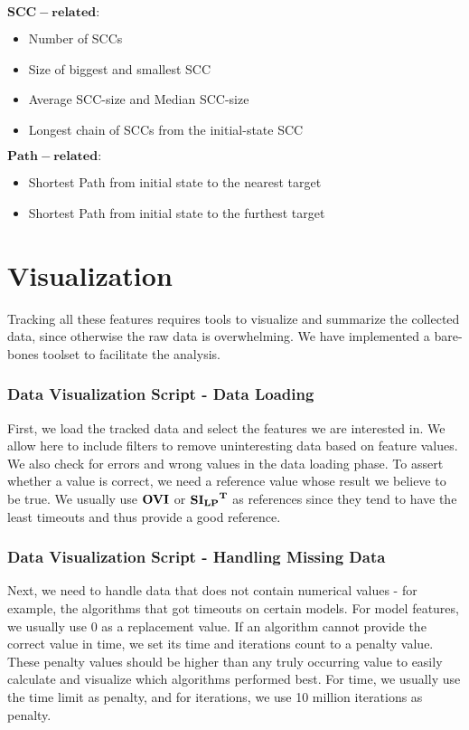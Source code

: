 $\mathbf{SCC-related:}$
\begin{itemize}
\item Number of SCCs
\item Size of biggest and smallest SCC
\item Average SCC-size and Median SCC-size
\item Longest chain of SCCs from the initial-state SCC
\end{itemize}

$\mathbf{Path-related}:$
\begin{itemize}
    \item Shortest Path from initial state to the nearest target
    \item Shortest Path from initial state to the furthest target
\end{itemize}

\section{Visualization}

Tracking all these features requires tools to visualize and summarize the collected data, since otherwise the raw data is overwhelming.
We have implemented a bare-bones toolset to facilitate the analysis. 

\subsubsection{Data Visualization Script - Data Loading}
First, we load the tracked data and select the features we are interested in. We allow here to include filters to remove uninteresting data based on feature values.
We also check for errors and wrong values in the data loading phase. To assert whether a value is correct, we need a reference value whose result we believe to be true.
We usually use $\mathbf{OVI}$ or $\mathbf{\mathbf{SI_{LP}}^T}$ as references since they tend to have the least timeouts and thus provide a good reference.

\subsubsection{Data Visualization Script - Handling Missing Data}
Next, we need to handle data that does not contain numerical values - for example, the algorithms that got timeouts on certain models.
For model features, we usually use 0 as a replacement value. 
If an algorithm cannot provide the correct value in time, we set its time and iterations count to a penalty value.
These penalty values should be higher than any truly occurring value to easily calculate and visualize which algorithms performed best.
For time, we usually use the time limit as penalty, and for iterations, we use 10 million iterations as penalty.

